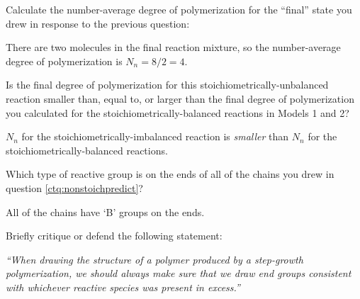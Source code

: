 \begin{activity}
\begin{ctqs}
		\question Calculate the number-average degree of polymerization for the ``final'' state you drew in response to the previous question:
		
		\begin{solution}[1in]
			There are two molecules in the final reaction mixture, so the number-average degree of polymerization is $N_n = 8/2 = 4$.
		\end{solution}
		
		\question Is the final degree of polymerization for this stoichiometrically-unbalanced reaction smaller than, equal to, or larger than the final degree of polymerization you calculated for the stoichiometrically-balanced reactions in Models 1 and 2?
		
		\begin{solution}[1in]
			$N_n$ for the stoichiometrically-imbalanced reaction is \emph{smaller} than $N_n$ for the stoichiometrically-balanced reactions.
		\end{solution}
		
		\question Which type of reactive group is on the ends of all of the chains you drew in question \ref{ctq:nonstoichpredict}?
		
		\begin{solution}[0.5in]
			All of the chains have `B' groups on the ends.
		\end{solution}
		
		\question Briefly critique or defend the following statement:
		
			\emph{``When drawing the structure of a polymer produced by a step-growth polymerization, we should always make sure that we draw end groups consistent with whichever reactive species was present in excess.''}
		
		\begin{solution}[1.85in]
		\end{solution}
			

\end{ctqs}
\end{activity}
